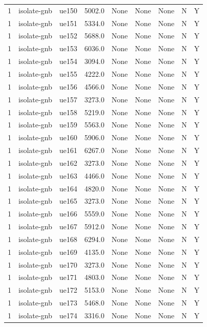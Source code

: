 \begin{table}[ht]
\begin{tabular}{|c|c|c|c|c|c|c|c|c|}
1 & isolate-gnb & ue150 & 5002.0 & None & None & None & N & Y \\
1 & isolate-gnb & ue151 & 5334.0 & None & None & None & N & Y \\
1 & isolate-gnb & ue152 & 5688.0 & None & None & None & N & Y \\
1 & isolate-gnb & ue153 & 6036.0 & None & None & None & N & Y \\
1 & isolate-gnb & ue154 & 3094.0 & None & None & None & N & Y \\
1 & isolate-gnb & ue155 & 4222.0 & None & None & None & N & Y \\
1 & isolate-gnb & ue156 & 4566.0 & None & None & None & N & Y \\
1 & isolate-gnb & ue157 & 3273.0 & None & None & None & N & Y \\
1 & isolate-gnb & ue158 & 5219.0 & None & None & None & N & Y \\
1 & isolate-gnb & ue159 & 5563.0 & None & None & None & N & Y \\
1 & isolate-gnb & ue160 & 5906.0 & None & None & None & N & Y \\
1 & isolate-gnb & ue161 & 6267.0 & None & None & None & N & Y \\
1 & isolate-gnb & ue162 & 3273.0 & None & None & None & N & Y \\
1 & isolate-gnb & ue163 & 4466.0 & None & None & None & N & Y \\
1 & isolate-gnb & ue164 & 4820.0 & None & None & None & N & Y \\
1 & isolate-gnb & ue165 & 3273.0 & None & None & None & N & Y \\
1 & isolate-gnb & ue166 & 5559.0 & None & None & None & N & Y \\
1 & isolate-gnb & ue167 & 5912.0 & None & None & None & N & Y \\
1 & isolate-gnb & ue168 & 6294.0 & None & None & None & N & Y \\
1 & isolate-gnb & ue169 & 4135.0 & None & None & None & N & Y \\
1 & isolate-gnb & ue170 & 3273.0 & None & None & None & N & Y \\
1 & isolate-gnb & ue171 & 4803.0 & None & None & None & N & Y \\
1 & isolate-gnb & ue172 & 5153.0 & None & None & None & N & Y \\
1 & isolate-gnb & ue173 & 5468.0 & None & None & None & N & Y \\
1 & isolate-gnb & ue174 & 3316.0 & None & None & None & N & Y \\

\end{tabular}
\end{table}
